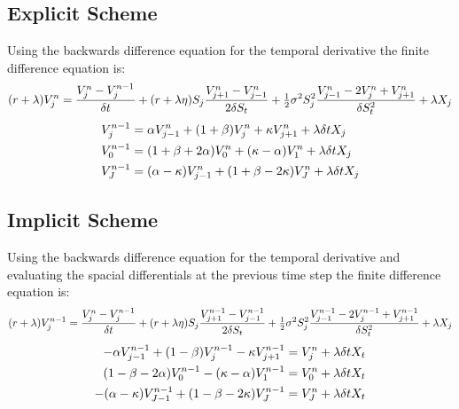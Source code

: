 \documentclass[a4paper,11pt,oneside]{report}
\theoremstyle{plain}
\theoremstyle{definition}
\begin{document}
\subsection{Explicit Scheme}
Using the backwards difference equation for the temporal derivative the finite difference equation is:
\begin{displaymath}
 (r + \lambda)V^{n}_j = \frac{V^{n}_j - V^{n - 1}_j}{\delta t} + (r + \lambda\eta)S_j\frac{V^{n}_{j + 1} - V^{n}_{j - 1}}{2\delta S_t} + \tfrac{1}{2}\sigma^2S_j^2\frac{V^{n}_{j - 1} - 2V^{n}_j + V^{n}_{j + 1}}{\delta S_t^2} + \lambda X_j
\end{displaymath}
\begin{align}
 V^{n - 1}_j &= \alpha V^{n}_{j - 1} + (1 + \beta)V^{n}_j + \kappa V^{n}_{j + 1} + \lambda\delta tX_j \\
 V^{n - 1}_{0} &= (1 + \beta + 2\alpha)V^{n}_{0} + (\kappa - \alpha)V^{n}_{1} + \lambda\delta tX_j \\
 V^{n - 1}_{J} &= (\alpha - \kappa)V^{n}_{j - 1} + (1 + \beta - 2\kappa)V^{n}_{J} + \lambda\delta tX_j
\end{align}


\subsection{Implicit Scheme}
Using the backwards difference equation for the temporal derivative and evaluating the spacial differentials at the previous time step the finite difference equation is:
\small\begin{displaymath}
 (r + \lambda)V^{n - 1}_j = \frac{V^{n}_j - V^{n - 1}_j}{\delta t} + (r + \lambda\eta)S_j\frac{V^{n - 1}_{j + 1} - V^{n - 1}_{j - 1}}{2\delta S_t} + \tfrac{1}{2}\sigma^2S_j^2\frac{V^{n - 1}_{j - 1} - 2V^{n - 1}_j + V^{n - 1}_{j + 1}}{\delta S_t^2} + \lambda X_j
\end{displaymath}\normalsize
\begin{align}
 -\alpha V^{n - 1}_{j - 1} + (1 - \beta)V^{n - 1}_j - \kappa V^{n - 1}_{j + 1} &= V^{n}_j + \lambda\delta tX_t \\
 (1 - \beta - 2\alpha)V^{n - 1}_{0} - (\kappa - \alpha)V^{n - 1}_{1} &= V^{n}_{0} + \lambda\delta tX_t \\
 -(\alpha - \kappa)V^{n - 1}_{J - 1} + (1 - \beta - 2\kappa)V^{n - 1}_{J} &= V^{n}_{J} + \lambda\delta tX_t
\end{align}

\end{document}
